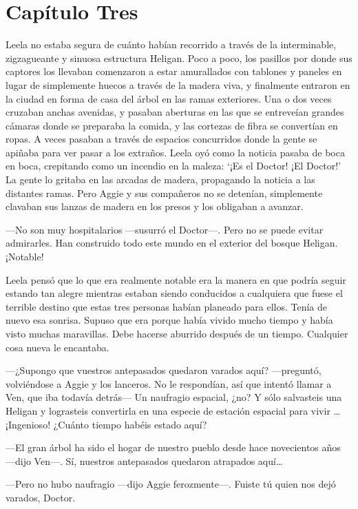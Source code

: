 \chapter*{Capítulo Tres}

Leela no estaba segura de cuánto habían recorrido a través de la
interminable, zigzagueante y sinuosa estructura Heligan. Poco a poco,
los pasillos por donde sus captores los llevaban comenzaron a estar
amurallados con tablones y paneles en lugar de simplemente huecos a
través de la madera viva, y finalmente entraron en la ciudad en forma de
casa del árbol en las ramas exteriores. Una o dos veces cruzaban anchas
avenidas, y pasaban aberturas en las que se entreveían grandes cámaras
donde se preparaba la comida, y las cortezas de fibra se convertían en
ropas. A veces pasaban a través de espacios concurridos donde la gente
se apiñaba para ver pasar a los extraños. Leela oyó como la noticia
pasaba de boca en boca, crepitando como un incendio en la maleza: `¡Es
el Doctor! ¡El Doctor!' La gente lo gritaba en las arcadas de madera,
propagando la noticia a las distantes ramas. Pero Aggie y sus compañeros
no se detenían, simplemente clavaban sus lanzas de madera en los presos
y los obligaban a avanzar.

---No son muy hospitalarios ---susurró el Doctor---. Pero no se puede
evitar admirarles. Han construido todo este mundo en el exterior del
bosque Heligan. ¡Notable!

Leela pensó que lo que era realmente notable era la manera en que podría
seguir estando tan alegre mientras estaban siendo conducidos a
cualquiera que fuese el terrible destino que estas tres personas habían
planeado para ellos. Tenía de nuevo esa sonrisa. Supuso que era porque
había vivido mucho tiempo y había visto muchas maravillas. Debe hacerse
aburrido después de un tiempo. Cualquier cosa nueva le encantaba.

---¿Supongo que vuestros antepasados quedaron varados aquí?
---preguntó, volviéndose a Aggie y los lanceros. No le respondían, así
que intentó llamar a Ven, que iba todavía detrás--- Un naufragio
espacial, ¿no? Y sólo salvasteis una Heligan y lograsteis convertirla en
una especie de estación espacial para vivir \ldots{} ¡Ingenioso! ¿Cuánto
tiempo habéis estado aquí?

---El gran árbol ha sido el hogar de nuestro pueblo desde hace
novecientos años ---dijo Ven---. Sí, nuestros antepasados quedaron
atrapados aquí\ldots{}

---Pero no hubo naufragio ---dijo Aggie ferozmente---. Fuiste tú quien
nos dejó varados, Doctor.

